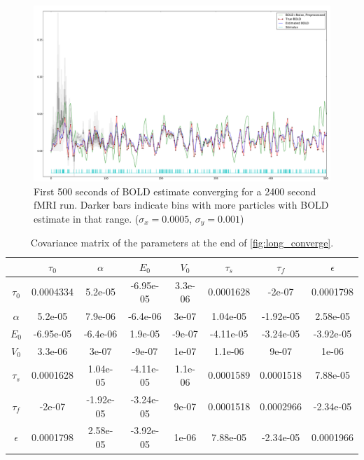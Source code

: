 \begin{figure}
\centering
\includegraphics[clip=true,trim=1cm 0cm 0cm 0cm, width=17cm]{images/long_converge_500}
\caption[First 500 seconds of \acs{BOLD} estimate 
converging for a 2400 second \acs{fMRI} run.]{First 500 seconds of \acs{BOLD} estimate 
converging for a 2400 second \acs{fMRI} run. Darker bars indicate
bins with more particles with \acs{BOLD} estimate in that range. ($\sigma_x = 0.0005$, $\sigma_y = 0.001$)}
\label{fig:long_converge_500}
\end{figure}

\begin{table}[t]
\begin{tabular}{|c | c  c  c  c  c  c  c |}
\hline
  & $\tau_0$ & $\alpha$ & $E_0$    & $V_0$    & $\tau_s$ & $\tau_f$ & $\epsilon$ \\
\hline
\rowcolor[gray]{.8} $\tau_0$  & 0.0004334 & 5.2e-05 & -6.95e-05 & 3.3e-06 & 0.0001628 & -2e-07 & 0.0001798 \\
$\alpha$                      & 5.2e-05 & 7.9e-06 & -6.4e-06 & 3e-07 & 1.04e-05 & -1.92e-05 & 2.58e-05 \\
\rowcolor[gray]{.8} $E_0$     & -6.95e-05 & -6.4e-06 & 1.9e-05 & -9e-07 & -4.11e-05 & -3.24e-05 & -3.92e-05 \\
$V_0$                         & 3.3e-06 & 3e-07 & -9e-07 & 1e-07 & 1.1e-06 & 9e-07 & 1e-06 \\
\rowcolor[gray]{.8} $\tau_s$  & 0.0001628 & 1.04e-05 & -4.11e-05 & 1.1e-06 & 0.0001589 & 0.0001518 & 7.88e-05 \\
$\tau_f$                      & -2e-07 & -1.92e-05 & -3.24e-05 & 9e-07 & 0.0001518 & 0.0002966 & -2.34e-05 \\
\rowcolor[gray]{.8} $\epsilon$& 0.0001798 & 2.58e-05 & -3.92e-05 & 1e-06 & 7.88e-05 & -2.34e-05 & 0.0001966 \\
\hline
\end{tabular}
\caption{Covariance matrix of the parameters at the end of \autoref{fig:long_converge}.}
\label{tab:long_cov}
\end{table}

